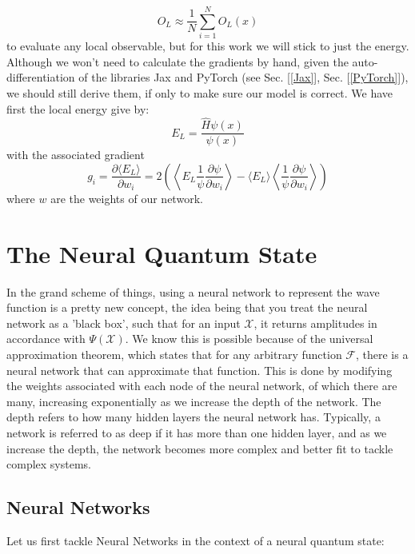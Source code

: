 \documentclass[12pt]{article}
\begin{document}
{\begin{equation*}
    O_L \approx \frac{1}{N}\sum_{i=1}^N O_L(x)
\end{equation*}
to evaluate any local observable, but for this work we will stick to just the energy.
\newline
Although we won't need to calculate the gradients by hand, given the auto-differentiation of the libraries Jax and PyTorch (see Sec. [\ref{Jax}], Sec. [\ref{PyTorch}]), we should still derive them, if only to make sure our model is correct.
\newline
We have first the local energy give by:
\begin{equation*}
    E_L = \frac{\hat H \psi(x)}{\psi(x)}
\end{equation*}
with the associated gradient
\begin{equation} \label{lossgrads}
    g_i = \frac{\partial \langle E_L \rangle}{\partial w_i} = 2\left( \left\langle E_L \frac{1}{\psi} \frac{\partial \psi}{\partial w_i} \right\rangle - \langle E_L \rangle \left\langle \frac{1}{\psi} \frac{\partial \psi}{\partial w_i} \right\rangle \right)
\end{equation}
where $w$ are the weights of our network.
\newline
\section{The Neural Quantum State} \label{nqs}
In the grand scheme of things, using a neural network to represent the wave function is a pretty new concept\cite{NQS}, the idea being that you treat the neural network as a 'black box', such that for an input $\mathcal{X}$, it returns amplitudes in accordance with $\Psi(\mathcal{X})$. We know this is possible because of the universal approximation theorem, which states that for any arbitrary function $\mathcal{F}$, there is a neural network that can approximate that function. This is done by modifying the weights associated with each node of the neural network, of which there are many, increasing exponentially as we increase the depth of the network. The depth refers to how many hidden layers the neural network has. Typically, a network is referred to as deep if it has more than one hidden layer, and as we increase the depth, the network becomes more complex and better fit to tackle complex systems. 
\newline
\subsection{Neural Networks}
Let us first tackle Neural Networks in the context of a neural quantum state:
}
\end{document}
